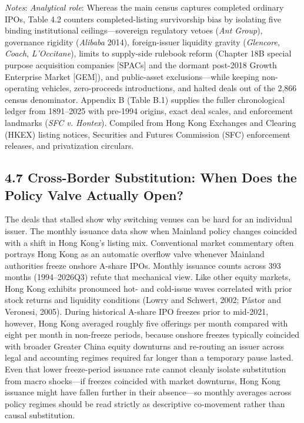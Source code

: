 \documentclass[11pt,letterpaper]{article}
\begin{document}
\begin{table}[!htbp]
\par\vspace{3pt}\noindent\parbox{\textwidth}{\scriptsize\raggedright \textit{Notes}: \textit{Analytical role}: Whereas the main census captures completed ordinary IPOs, Table 4.2 counters completed-listing survivorship bias by isolating five binding institutional ceilings—sovereign regulatory vetoes (\textit{Ant Group}), governance rigidity (\textit{Alibaba} 2014), foreign-issuer liquidity gravity (\textit{Glencore}, \textit{Coach}, \textit{L'Occitane}), limits to supply-side rulebook reform (Chapter 18B special purpose acquisition companies [SPACs] and the dormant post-2018 Growth Enterprise Market [GEM]), and public-asset exclusions—while keeping non-operating vehicles, zero-proceeds introductions, and halted deals out of the 2,866 census denominator. Appendix B (Table B.1) supplies the fuller chronological ledger from 1891–2025 with pre-1994 origins, exact deal scales, and enforcement landmarks (\textit{SFC v. Hontex}). Compiled from Hong Kong Exchanges and Clearing (HKEX) listing notices, Securities and Futures Commission (SFC) enforcement releases, and privatization circulars.}
\end{table}

\subsection*{\texorpdfstring{4.7 Cross-Border Substitution: When Does the Policy Valve Actually Open?}{4.7 Cross-Border Substitution: When Does the Policy Valve Actually Open?}}
The deals that stalled show why switching venues can be hard for an individual issuer. The monthly issuance data show when Mainland policy changes coincided with a shift in Hong Kong’s listing mix. Conventional market commentary often portrays Hong Kong as an automatic overflow valve whenever Mainland authorities freeze onshore A-share IPOs. Monthly issuance counts across 393 months (1994–2026Q3) refute that mechanical view. Like other equity markets, Hong Kong exhibits pronounced hot- and cold-issue waves correlated with prior stock returns and liquidity conditions (Lowry and Schwert, 2002; Pástor and Veronesi, 2005). During historical A-share IPO freezes prior to mid-2021, however, Hong Kong averaged roughly five offerings per month compared with eight per month in non-freeze periods, because onshore freezes typically coincided with broader Greater China equity downturns and re-routing an issuer across legal and accounting regimes required far longer than a temporary pause lasted. Even that lower freeze-period issuance rate cannot cleanly isolate substitution from macro shocks—if freezes coincided with market downturns, Hong Kong issuance might have fallen further in their absence—so monthly averages across policy regimes should be read strictly as descriptive co-movement rather than causal substitution.
\end{document}
